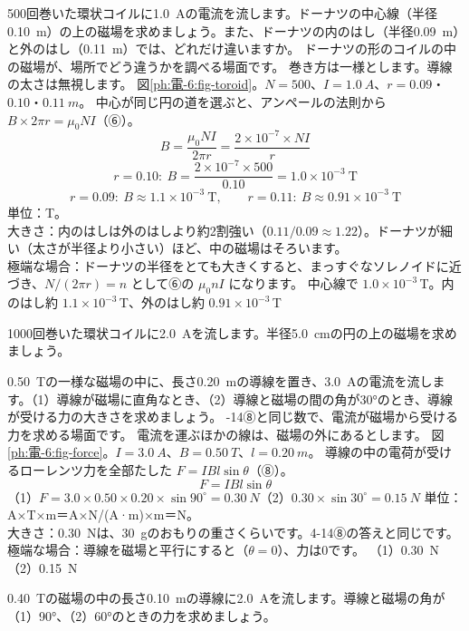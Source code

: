 \label{ph:電-6:ex4}
\begin{phreidai}[環状コイルの中の磁場]
500回巻いた環状コイルに\qty{1.0}{A}の電流を流します。ドーナツの中心線（半径\qty{0.10}{m}）の上の磁場を求めましょう。また、ドーナツの内のはし（半径\qty{0.09}{m}）と外のはし（\qty{0.11}{m}）では、どれだけ違いますか。
\phbamen
ドーナツの形のコイルの中の磁場が、場所でどう違うかを調べる場面です。
\phmushi
巻き方は一様とします。導線の太さは無視します。
\phzu
図\ref{ph:電-6:fig-toroid}。$N=500$、$I=\qty{1.0}{A}$、$r=0.09$・$0.10$・$\qty{0.11}{m}$。
\phriyu
中心が同じ円の道を選ぶと、アンペールの法則から $B\times2\pi r=\mu_0NI$（⑥）。
\phtateru
\[B=\frac{\mu_0NI}{2\pi r}=\frac{2\times10^{-7}\times NI}{r}\]
\phtoku
\[r=0.10:\ B=\frac{2\times10^{-7}\times500}{0.10}=1.0\times10^{-3}\ \text{T}\]
\[r=0.09:\ B\approx1.1\times10^{-3}\ \text{T},\qquad r=0.11:\ B\approx0.91\times10^{-3}\ \text{T}\]
\phtashikame
単位：T。\\
大きさ：内のはしは外のはしより約2割強い（$0.11/0.09\approx1.22$）。ドーナツが細い（太さが半径より小さい）ほど、中の磁場はそろいます。\\
極端な場合：ドーナツの半径をとても大きくすると、まっすぐなソレノイドに近づき、$N/(2\pi r)=n$ として⑥の $\mu_0nI$ になります。
\kotae 中心線で $1.0\times10^{-3}$\,T。内のはし約 $1.1\times10^{-3}$\,T、外のはし約 $0.91\times10^{-3}$\,T
\end{phreidai}
\begin{jibun}
1000回巻いた環状コイルに\qty{2.0}{A}を流します。半径\qty{5.0}{cm}の円の上の磁場を求めましょう。
\end{jibun}

\label{ph:電-6:ex5}
\begin{phreidai}[磁場の中の導線が受ける力]
\qty{0.50}{T}の一様な磁場の中に、長さ\qty{0.20}{m}の導線を置き、\qty{3.0}{A}の電流を流します。（1）導線が磁場に直角なとき、（2）導線と磁場の間の角が30°のとき、導線が受ける力の大きさを求めましょう。
-14⑧と同じ数で、電流が磁場から受ける力を求める場面です。
\phmushi
電流を運ぶほかの線は、磁場の外にあるとします。
\phzu
図\ref{ph:電-6:fig-force}。$I=\qty{3.0}{A}$、$B=\qty{0.50}{T}$、$l=\qty{0.20}{m}$。
\phriyu
導線の中の電荷が受けるローレンツ力を全部たした $F=IBl\sin\theta$（⑧）。
\phtateru
\[F=IBl\sin\theta\]
\phtoku
（1）$F=3.0\times0.50\times0.20\times\sin90^\circ=\qty{0.30}{N}$\quad（2）$0.30\times\sin30^\circ=\qty{0.15}{N}$
\phtashikame
単位：A×T×m＝A×N/(A·m)×m＝N。\\
大きさ：\qty{0.30}{N}は、\qty{30}{g}のおもりの重さくらいです。4-14⑧の答えと同じです。\\
極端な場合：導線を磁場と平行にすると（$\theta=0$）、力は0です。
\kotae （1）\qty{0.30}{N}　（2）\qty{0.15}{N}
\end{phreidai}
\begin{jibun}
\qty{0.40}{T}の磁場の中の長さ\qty{0.10}{m}の導線に\qty{2.0}{A}を流します。導線と磁場の角が（1）90°、（2）60°のときの力を求めましょう。
\end{jibun}


